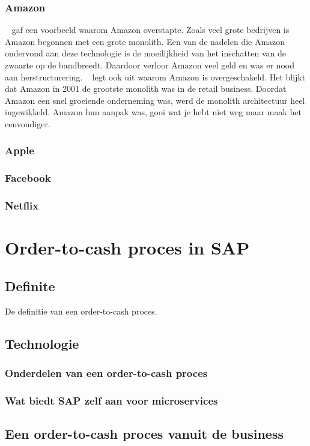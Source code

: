 \subsubsection{Amazon}
~\cite{Mauersberger2017} gaf een voorbeeld waarom Amazon overstapte. Zoals veel grote bedrijven is Amazon begonnen met een grote monolith. Een van de nadelen die Amazon ondervond aan deze technologie is de moeilijkheid van het inschatten van de zwaarte op de bandbreedt. Daardoor verloor Amazon veel geld en was er nood aan herstructurering.
~\cite{Fulton2015} legt ook uit waarom Amazon is overgeschakeld. Het blijkt dat Amazon in 2001 de grootste monolith was in de retail business. Doordat Amazon een snel groeiende onderneming was, werd de monolith architectuur heel ingewikkeld. Amazon hun aanpak was, gooi wat je hebt niet weg maar maak het eenvoudiger. 
\subsubsection{Apple}
\subsubsection{Facebook}
\subsubsection{Netflix}

\section{Order-to-cash proces in SAP}
\subsection{Definite}
De definitie van een order-to-cash proces.
\subsection{Technologie}
\subsubsection{Onderdelen van een order-to-cash proces}
\subsubsection{Wat biedt SAP zelf aan voor microservices}
\subsection{Een order-to-cash proces vanuit de business}
